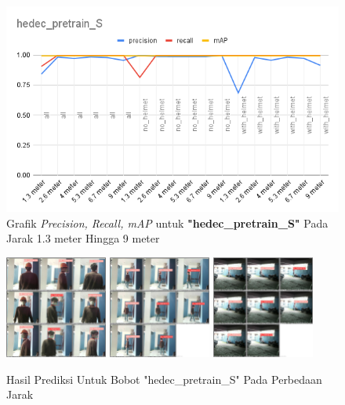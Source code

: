 \begin{enumerate}
  \begin{figure}[h!]
    \centering
    \includegraphics[width=1\textwidth]{gambar/BerdasarkanJarak/hedec_pretrain_S.png}
    \caption{Grafik \emph{Precision, Recall, mAP} untuk \textbf{"hedec\_pretrain\_S"} Pada Jarak 1.3 meter Hingga 9 meter}
    \label{fig:grafvaljarak_hedec_pretrain_S}  
  \end{figure}

  \begin{figure} [h!]
    \centering
    \includegraphics[width=0.3\textwidth]{gambar/BerdasarkanJarak_v2/val_hedec_pretrain_S/Jarak1_3/val_batch0_pred.jpg}
    \includegraphics[width=0.3\textwidth]{gambar/BerdasarkanJarak_v2/val_hedec_pretrain_S/Jarak5_3/val_batch0_pred.jpg}
    \includegraphics[width=0.3\textwidth]{gambar/BerdasarkanJarak_v2/val_hedec_pretrain_S/Jarak9/val_batch0_pred.jpg}
    \caption{Hasil Prediksi Untuk Bobot "hedec\_pretrain\_S" Pada Perbedaan Jarak}
    \label{fig:valjarak_sample_hedec_pretrain_S}  
  \end{figure}


\end{enumerate}
